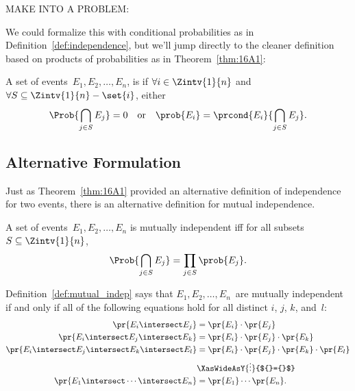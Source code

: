 \begin{editingnotes}
MAKE INTO A PROBLEM:

We could formalize this with conditional probabilities
as in Definition~\ref{def:independence}, but we'll jump directly to
the cleaner definition based on products of probabilities as in
Theorem~\ref{thm:16A1}:

\begin{definition}\label{def:mutual_independence}
A set of events~$E_1, E_2, \dots, E_n$, is 
if $\forall i \in \Zintv{1}{n}$ and $\forall S \subseteq \Zintv{1}{n} - \set{i}$,
either
\begin{equation*}
    \Prob{\bigcap_{j \in S} E_j} = 0
\quad
\text{or}
\quad
    \prob{E_i} = \prcond{E_i}{\bigcap_{j \in S} E_j}.
\end{equation*}
\end{definition}

\subsection{Alternative Formulation}

Just as Theorem~\ref{thm:16A1} provided an alternative definition of
independence for two events, there is an alternative definition for
mutual independence.


\begin{definition}\label{def:mutual_indep}
A set of events~$E_1, E_2, \dots, E_n$ is mutually independent iff
for all subsets $S \subseteq \Zintv{1}{n}$,
\begin{equation*}
    \Prob{\bigcap_{j \in S} E_j} = \prod_{j \in S} \prob{E_j}.
\end{equation*}
\end{definition}

Definition~\ref{def:mutual_indep} says that $E_1, E_2, \dots, E_n$~are
mutually independent if and only if all of the following equations
hold for all distinct $i$, $j$, $k$, and~$l$:
%
\begin{align*}
\pr{E_i \intersect E_j}
    & = \pr{E_i} \cdot \pr{E_j}
 \\
\pr{E_i \intersect E_j \intersect E_k}
    & = \pr{E_i} \cdot \pr{E_j} \cdot \pr{E_k}
 \\
\pr{E_i \intersect E_j \intersect E_k \intersect E_l}
    & = \pr{E_i} \cdot \pr{E_j} \cdot \pr{E_k} \cdot \pr{E_l}
 \\
    & \XasWideAsY{\vdots}{${}={}$} \\
\pr{E_1 \intersect \cdots \intersect E_n} & = \pr{E_1} \cdots \pr{E_n}.
\end{align*}


\end{editingnotes}
